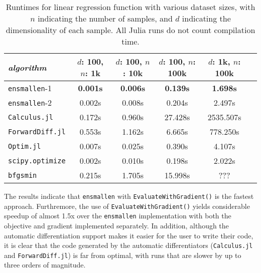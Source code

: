 \documentclass{article}
\begin{document}
{\begin{table}
\begin{center}
\begin{tabular}{lccccc}
\toprule
{\em algorithm} & $d$: 100, $n$: 1k & $d$: 100, $n$: 10k & $d$: 100, $n$:
100k & $d$: 1k, $n$: 100k \\
\midrule
{\tt ensmallen}-1 & {\bf 0.001s} & {\bf 0.006s} & {\bf 0.139s} & {\bf 1.698s} \\
{\tt ensmallen}-2 & 0.002s & 0.008s & 0.204s & 2.497s \\
{\tt Calculus.jl} & 0.172s & 0.960s & 27.428s & 2535.507s \\
{\tt ForwardDiff.jl} & 0.553s & 1.162s & 6.665s & 778.250s \\
{\tt Optim.jl} & 0.007s & 0.025s & 0.390s & 4.107s \\
{\tt scipy.optimize} & 0.002s & 0.010s & 0.198s & 2.022s \\
{\tt bfgsmin} & 0.215s & 1.705s & 15.998s & ??? \\
\bottomrule
\end{tabular}
\end{center}
\caption{Runtimes for linear regression function with various dataset sizes,
with $n$ indicating the number of samples,
and $d$ indicating the dimensionality of each sample.
All Julia runs do not count compilation time.}
\label{tab:lbfgs}
\end{table}

The results indicate that {\tt ensmallen} with {\tt EvaluateWithGradient()}
is the fastest approach.
Furthremore, the use of {\tt EvaluateWithGradient()} yields considerable
speedup of almost 1.5x over the {\tt ensmallen} implementation with both the
objective and gradient implemented separately.  In addition, although the
automatic differentiation support makes it easier for the user to write their
code, it is clear that the code generated by the automatic differentiators
({\tt Calculus.jl} and {\tt ForwardDiff.jl})
is far from optimal, with runs that are slower by up to three orders of magnitude.

%

}
\end{document}
